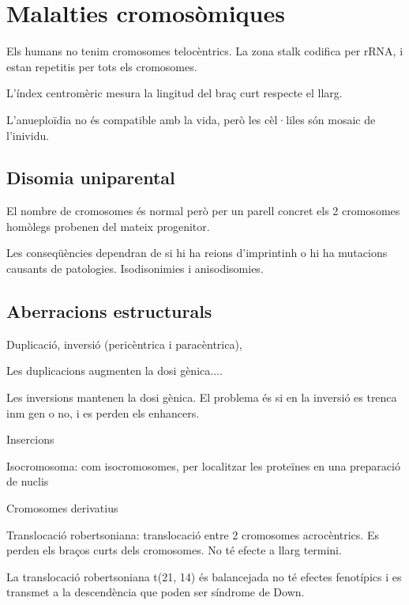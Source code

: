 
\section{Malalties cromosòmiques}
\label{sec:malalt-crom}

Els humans no tenim cromosomes telocèntrics. La zona stalk codifica per rRNA, i estan repetitis per tots els cromosomes.

L'índex centromèric mesura la lingitud del braç curt respecte el llarg.

L'anueploïdia no és compatible amb la vida, però les cèl·liles són mosaic de l'inividu.


\subsection{Disomia uniparental}
\label{sec:disomia-uniparental}

El nombre de cromosomes és normal però per un parell concret els 2 cromosomes homòlegs probenen del mateix progenitor.

Les conseqüències dependran de si hi ha reions d'imprintinh o hi ha mutacions causants de patologies. Isodisonimies i anisodisomies.


\subsection{Aberracions estructurals}
\label{sec:aberr-estr}

Duplicació, inversió (pericèntrica i paracèntrica), 

Les duplicacions augmenten la dosi gènica....

Les inversions mantenen la dosi gènica. El problema és si en la inversió es trenca inm gen o no, i es perden els enhancers.

Insercions

Isocromosoma:  com isocromosomes, per localitzar les proteïnes en una preparació de nuclis

Cromosomes derivatius

Translocació robertsoniana: translocació entre 2 cromosomes acrocèntrics. Es perden els braços curts dels cromosomes. No té efecte a llarg termini.

La translocació robertsoniana t(21, 14) és balancejada no té efectes fenotípics i es transmet a la descendència que poden ser síndrome de Down.